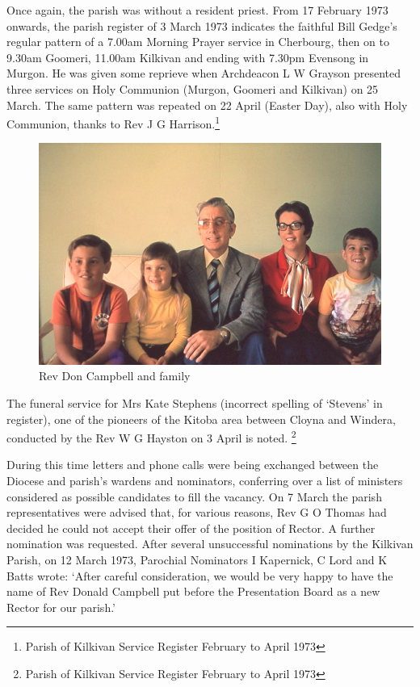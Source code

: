 Once again, the parish was without a resident priest. From 17 February
1973 onwards, the parish register of 3 March 1973 indicates the faithful
Bill Gedge's regular pattern of a 7.00am Morning Prayer service in
Cherbourg, then on to 9.30am Goomeri, 11.00am Kilkivan and ending with
7.30pm Evensong in Murgon. He was given some reprieve when Archdeacon L
W Grayson presented three services on Holy Communion (Murgon, Goomeri
and Kilkivan) on 25 March. The same pattern was repeated on 22 April
(Easter Day), also with Holy Communion, thanks to Rev J G
Harrison.\footnote{Parish of Kilkivan Service Register February to April
  1973}




\begin{figure}[!h]
\begin{center}
\includegraphics[width=.7\textwidth,center]{images/DonCambellAndFamily.jpg}
\caption{Rev Don Campbell and family}
\end{center}
\end{figure}


The funeral service for Mrs Kate Stephens (incorrect spelling of
`Stevens' in register), one of the pioneers of the Kitoba area between
Cloyna and Windera, conducted by the Rev W G Hayston on 3 April is
noted. \footnote{Parish of Kilkivan Service Register February to April
  1973}

During this time letters and phone calls were being exchanged between
the Diocese and parish's wardens and nominators, conferring over a list
of ministers considered as possible candidates to fill the vacancy. On 7
March the parish representatives were advised that, for various reasons,
Rev G O Thomas had decided he could not accept their offer of the
position of Rector. A further nomination was requested. After several
unsuccessful nominations by the Kilkivan Parish, on 12 March 1973,
Parochial Nominators I Kapernick, C Lord and K Batts wrote: `After
careful consideration, we would be very happy to have the name of Rev
Donald Campbell put before the Presentation Board as a new Rector for
our parish.'

